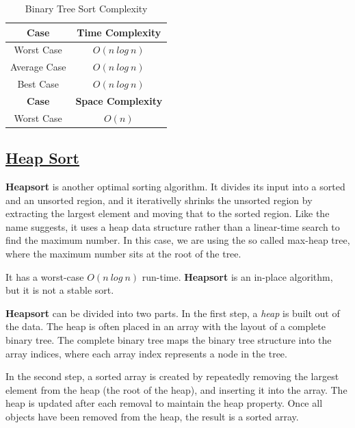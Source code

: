 \documentclass{article}
\begin{document}
\begin{table}[H]
  \begin{center}
    \label{Binary Tree Sort Complexity}
    \begin{tabular}{c|c}
      \toprule
      \textbf{Case} & \textbf{Time Complexity} \\
      \midrule
      Worst Case & $O(n\ log\ n)$ \\
      Average Case & $O(n\ log\ n)$ \\
      Best Case & $O(n\ log\ n)$ \\
      \bottomrule
      \toprule
      \textbf{Case} & \textbf{Space Complexity} \\
      \midrule
      Worst Case & $O(n)$ \\
    \end{tabular}
    \caption{Binary Tree Sort Complexity}
  \end{center}
\end{table}

\subsection{\underline{Heap Sort}}

\textbf{Heapsort} is another optimal sorting algorithm. It divides its input into a sorted and an unsorted region, and it iterativelly shrinks the unsorted region by extracting the largest element and moving that to the sorted region. Like the name suggests, it uses a heap data structure rather than a linear-time search to find the maximum number. In this case, we are using the so called max-heap tree, where the maximum number sits at the root of the tree.

It has a worst-case $O(n\ log\ n)$ run-time. \textbf{Heapsort} is an in-place algorithm, but it is not a stable sort.

\textbf{Heapsort} can be divided into two parts. In the first step, a \textit{heap} is built out of the data. The heap is often placed in an array with the layout of a complete binary tree. The complete binary tree maps the binary tree structure into the array indices, where each array index represents a node in the tree.

In the second step, a sorted array is created by repeatedly removing the largest element from the heap (the root of the heap), and inserting it into the array. The heap is updated after each removal to maintain the heap property. Once all objects have been removed from the heap, the result is a sorted array.
\end{document}

